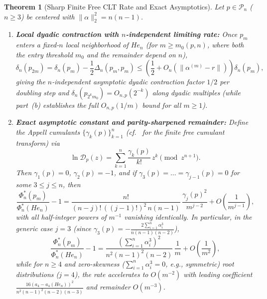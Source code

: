 \documentclass[11pt,a4paper]{article}
\newtheorem{theorem}{Theorem}[section]
\theoremstyle{definition}
\begin{document}
\begin{theorem}[Sharp Finite Free CLT Rate and Exact Asymptotics]
\label{thm:clt}
Let $p \in \mathcal{P}_n$ ($n \ge 3$) be centered with $\|\alpha\|_2^2 = n(n-1)$.
\begin{enumerate}
\item[(a)] \textbf{Local dyadic contraction with $n$-independent limiting rate:} Once $p_m$ enters a fixed-$n$ local neighborhood of $He_n$ (for $m \ge m_0(p,n)$, where both the entry threshold $m_0$ and the remainder depend on $n$),
\[
\delta_n(p_{2m}) = \delta_n(p_m) - \frac{1}{2} \Delta_n(p_m, p_m) \le \left(\frac{1}{2} + O_n(\|\alpha^{(m)} - r\|)\right) \delta_n(p_m),
\]
giving the $n$-independent asymptotic dyadic contraction factor $1/2$ per doubling step and $\delta_n(p_{2^k m_0}) = O_{n,p}(2^{-k})$ along dyadic multiples (while part~(b) establishes the full $O_{n,p}(1/m)$ bound for all $m \ge 1$).
\item[(b)] \textbf{Exact asymptotic constant and parity-sharpened remainder:} Define the Appell cumulants $\{\gamma_k(p)\}_{k=1}^n$ (cf.~\cite{AP2018} for the finite free cumulant transform) via
\[
\ln \mathcal{D}_p(z) = \sum_{k=1}^n \frac{\gamma_k(p)}{k!}\, z^k \pmod{z^{n+1}}.
\]
Then $\gamma_1(p) = 0$, $\gamma_2(p) = -1$, and if $\gamma_3(p) = \dots = \gamma_{j-1}(p) = 0$ for some $3 \le j \le n$, then
\begin{equation}
\label{eq:clt-exact}
\frac{\Phi_n^*(p_m)}{\Phi_n^*(He_n)} - 1 = \frac{n!}{(n-j)!\,((j-1)!)^2\, n(n-1)}\, \frac{\gamma_j(p)^2}{m^{j-2}} + O\!\left(\frac{1}{m^{j-1}}\right),
\end{equation}
with all half-integer powers of $m^{-1}$ vanishing identically. In particular, in the generic case $j = 3$ (since $\gamma_3(p) = -\frac{2\sum_{i=1}^n \alpha_i^3}{n(n-1)(n-2)}$),
\[
\frac{\Phi_n^*(p_m)}{\Phi_n^*(He_n)} - 1 = \frac{\left(\sum_{i=1}^n \alpha_i^3\right)^2}{n^2 (n-1)^2 (n-2)}\, \frac{1}{m} + O\!\left(\frac{1}{m^2}\right),
\]
while for $n \ge 4$ and zero-skewness ($\sum_{i=1}^n \alpha_i^3 = 0$, e.g., symmetric) root distributions ($j=4$), the rate accelerates to $O(m^{-2})$ with leading coefficient $\frac{16 (a_4 - a_4(He_n))^2}{n^2 (n-1)^2 (n-2)(n-3)}$ and remainder $O(m^{-3})$.
\end{enumerate}
\end{theorem}
\end{document}
